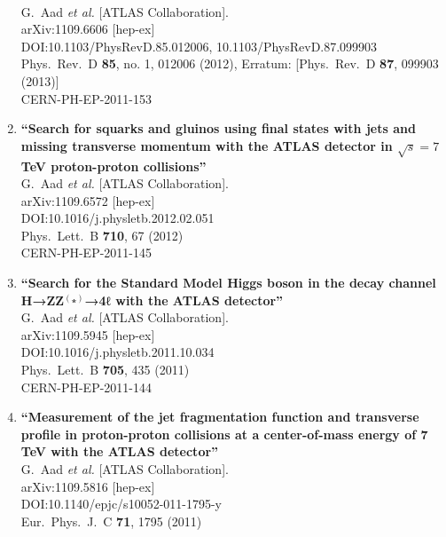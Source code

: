 \documentclass{article}
\begin{document}
\begin{enumerate}
  \\{}G.~Aad {\it et al.} [ATLAS Collaboration].
  \\{}arXiv:1109.6606 [hep-ex]
  \\{}DOI:10.1103/PhysRevD.85.012006, 10.1103/PhysRevD.87.099903
  \\{}Phys.\ Rev.\ D {\bf 85}, no. 1, 012006 (2012), Erratum: [Phys.\ Rev.\ D {\bf 87}, 099903 (2013)]
  \\{}CERN-PH-EP-2011-153
\item%
{\bf ``Search for squarks and gluinos using final states with jets and missing transverse momentum with the ATLAS detector in $\sqrt{s}=7$ TeV proton-proton collisions''}
  \\{}G.~Aad {\it et al.} [ATLAS Collaboration].
  \\{}arXiv:1109.6572 [hep-ex]
  \\{}DOI:10.1016/j.physletb.2012.02.051
  \\{}Phys.\ Lett.\ B {\bf 710}, 67 (2012)
  \\{}CERN-PH-EP-2011-145
\item%
{\bf ``Search for the Standard Model Higgs boson in the decay channel H→ZZ$^{(⁎)}$→4ℓ with the ATLAS detector''}
  \\{}G.~Aad {\it et al.} [ATLAS Collaboration].
  \\{}arXiv:1109.5945 [hep-ex]
  \\{}DOI:10.1016/j.physletb.2011.10.034
  \\{}Phys.\ Lett.\ B {\bf 705}, 435 (2011)
  \\{}CERN-PH-EP-2011-144
\item%
{\bf ``Measurement of the jet fragmentation function and transverse profile in proton-proton collisions at a center-of-mass energy of 7 TeV with the ATLAS detector''}
  \\{}G.~Aad {\it et al.} [ATLAS Collaboration].
  \\{}arXiv:1109.5816 [hep-ex]
  \\{}DOI:10.1140/epjc/s10052-011-1795-y
  \\{}Eur.\ Phys.\ J.\ C {\bf 71}, 1795 (2011)

\end{enumerate}
\end{document}

